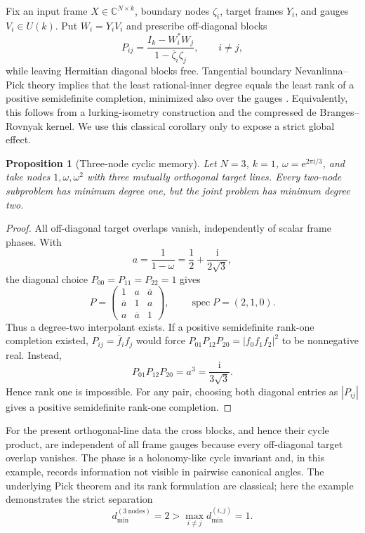 \documentclass[11pt]{article}
\newtheorem{proposition}[theorem]{Proposition}
\theoremstyle{definition}
\theoremstyle{remark}
\newcommand{\C}{\mathbb C}
\newcommand{\e}{\mathrm e}
\begin{document}
Fix an input frame $X\in\C^{N\times k}$, boundary nodes $\zeta_i$, target
frames $Y_i$, and gauges $V_i\in U(k)$.  Put $W_i=Y_iV_i$ and prescribe
off-diagonal blocks
\begin{equation}\label{eq:gp}
 P_{ij}=\frac{I_k-W_i^*W_j}{1-\overline\zeta_i\zeta_j},
 \qquad i\ne j,
\end{equation}
while leaving Hermitian diagonal blocks free.  Tangential boundary
Nevanlinna--Pick theory implies that the least rational-inner degree equals
the least rank of a positive semidefinite completion, minimized also over
the gauges \cite[Thms.~4.7, 5.1 and 8.2]{BolotnikovDym2006}.  Equivalently,
this follows from a lurking-isometry construction and the compressed
de Branges--Rovnyak kernel.  We use this classical corollary only to expose a
strict global effect.

\begin{proposition}[Three-node cyclic memory]\label{prop:cycle}
Let $N=3$, $k=1$, $\omega=\e^{2\pi\mathrm i/3}$, and take nodes
$1,\omega,\omega^2$ with three mutually orthogonal target lines.  Every
two-node subproblem has minimum degree one, but the joint problem has minimum
degree two.
\end{proposition}

\begin{proof}
All off-diagonal target overlaps vanish, independently of scalar frame
phases.  With
\[
 a=\frac{1}{1-\omega}=\frac12+\frac{\mathrm i}{2\sqrt3},
\]
the diagonal choice $P_{00}=P_{11}=P_{22}=1$ gives
\begin{equation}\label{eq:cycleP}
 P=\begin{pmatrix}
 1&a&\overline a\\
 \overline a&1&a\\
 a&\overline a&1
 \end{pmatrix},
 \qquad \operatorname{spec}P=(2,1,0).
\end{equation}
Thus a degree-two interpolant exists.  If a positive semidefinite rank-one
completion existed, $P_{ij}=\overline f_i f_j$ would force
$P_{01}P_{12}P_{20}=|f_0f_1f_2|^2$ to be nonnegative real.  Instead,
\begin{equation}\label{eq:cyclephase}
 P_{01}P_{12}P_{20}=a^3=\frac{\mathrm i}{3\sqrt3}.
\end{equation}
Hence rank one is impossible.  For any pair, choosing both diagonal entries
as $|P_{ij}|$ gives a positive semidefinite rank-one completion.
\end{proof}

For the present orthogonal-line data the cross blocks, and hence their cycle
product, are independent of all frame gauges because every off-diagonal
target overlap vanishes.  The phase is a holonomy-like cycle invariant and,
in this example, records information not visible in pairwise canonical
angles.  The underlying Pick theorem and its rank formulation are classical;
here the example demonstrates the strict separation
\[
 d_{\min}^{(3\ \mathrm{nodes})}=2>
 \max_{i\ne j}d_{\min}^{(i,j)}=1.
\]
\end{document}
